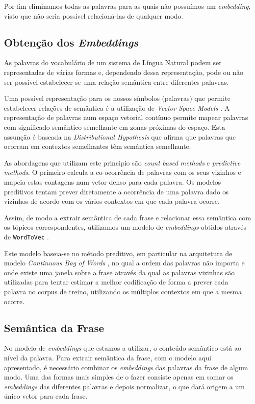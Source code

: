 \documentclass[a4paper,twocolumn]{article}
\begin{document}
Por fim eliminamos todas as palavras para as quais não possuímos um \textit{embedding}, visto que não seria possível relacioná-las de qualquer modo.

\subsection{Obtenção dos \textit{Embeddings}} \label{embeddings}

As palavras do vocabulário de um sistema de Língua Natural podem ser representadas de várias formas e, dependendo dessa representação, pode ou não ser possível estabelecer-se uma relação semântica entre diferentes palavras.

Uma possível representação para os nossos símbolos (palavras) que permite estabelecer relações de semântica é a utilização de \textit{Vector Space Models} \cite{DBLP:conf/emnlp/ErkP08}. A representação de palavras num espaço vetorial contínuo permite mapear palavras com significado semântico semelhante em zonas próximas do espaço. Esta assunção é baseada na \textit{Distributional Hypothesis} \cite{DBLP:conf/cogsci/DyeJYR17} que afirma que palavras que ocorram em contextos semelhantes têm semântica semelhante.

As abordagens que utilizam este principio são \textit{count based methods} e \textit{predictive methods}. O primeiro calcula a co-ocorrência de palavras com os seus vizinhos e mapeia estas contagens num vetor denso para cada palavra. Os modelos preditivos tentam prever diretamente a ocorrência de uma palavra dado os vizinhos de acordo com os vários contextos em que cada palavra ocorre.
\medskip

Assim, de modo a extrair semântica de cada frase e relacionar essa semântica com os tópicos correspondentes, utilizamos um modelo de \textit{embeddings}\label{modelusage} \cite{google_w2v} obtidos através de \texttt{WordToVec} \cite{DBLP:journals/corr/abs-1301-3781}.

Este modelo baseia-se no método preditivo, em particular na arquitetura de modelo \textit{Continuous Bag of Words} \cite{DBLP:journals/corr/abs-1301-3781}, no qual a ordem das palavras não importa e onde existe uma janela sobre a frase através da qual as palavras vizinhas são utilizadas para tentar estimar a melhor codificação de forma a prever cada palavra no corpus de treino, utilizando os múltiplos contextos em que a mesma ocorre.

\subsection{Semântica da Frase}
No modelo de \textit{embeddings} que estamos a utilizar, o conteúdo semântico está ao nível da palavra. Para extrair semântica da frase, com o modelo  aqui apresentado, é necessário combinar os \textit{embeddings} das palavras da frase de algum modo.
Uma das formas mais simples de o fazer consiste apenas em somar os \textit{embeddings} das diferentes palavras e depois normalizar, o que dará origem a um único vetor para cada frase.
\medskip
\end{document}
